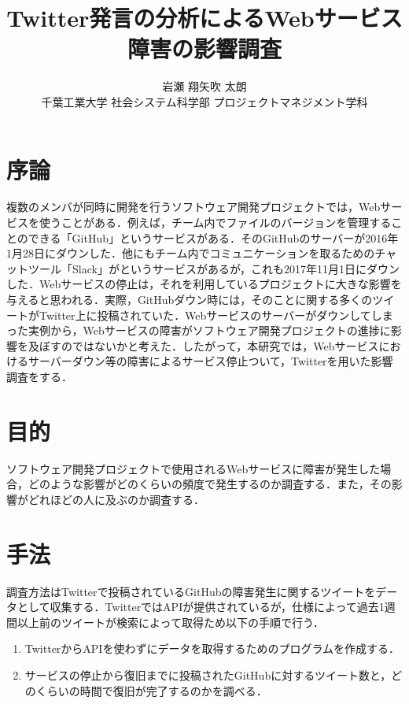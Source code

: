 \documentclass[uplatex,twocolumn]{jsarticle}
\title{\vspace{-10mm}Twitter発言の分析によるWebサービス障害の影響調査\footnotemark[0]}
\author{\large{岩瀬 翔\footnotemark[2]\qquad 矢吹 太朗}\\千葉工業大学 社会システム科学部 プロジェクトマネジメント学科\footnotemark[3]}
\date{}
\begin{document}
\twocolumn[\maketitle]

\begingroup
\def\thefootnote{\fnsymbol{footnote}}
\endgroup

\section{序論}

複数のメンバが同時に開発を行うソフトウェア開発プロジェクトでは，Webサービスを使うことがある．例えば，チーム内でファイルのバージョンを管理することのできる「GitHub」というサービスがある\cite{01}．そのGitHubのサーバーが2016年1月28日にダウンした．他にもチーム内でコミュニケーションを取るためのチャットツール「Slack」がというサービスがあるが，これも2017年11月1日にダウンした．Webサービスの停止は，それを利用しているプロジェクトに大きな影響を与えると思われる．実際，GitHubダウン時には，そのことに関する多くのツイートがTwitter上に投稿されていた\cite{02}．Webサービスのサーバーがダウンしてしまった実例から，Webサービスの障害がソフトウェア開発プロジェクトの進捗に影響を及ぼすのではないかと考えた．したがって，本研究では，Webサービスにおけるサーバーダウン等の障害によるサービス停止ついて，Twitterを用いた影響調査をする．

\section{目的}

ソフトウェア開発プロジェクトで使用されるWebサービスに障害が発生した場合，どのような影響がどのくらいの頻度で発生するのか調査する．また，その影響がどれほどの人に及ぶのか調査する．

\section{手法}

調査方法はTwitterで投稿されているGitHubの障害発生に関するツイートをデータとして収集する．TwitterではAPIが提供されているが，仕様によって過去1週間以上前のツイートが検索によって取得ため以下の手順で行う．
\begin{enumerate}
 \item TwitterからAPIを使わずにデータを取得するためのプログラムを作成する．
 \item サービスの停止から復旧までに投稿されたGitHubに対するツイート数と，どのくらいの時間で復旧が完了するのかを調べる．
\end{enumerate}
\end{document}
